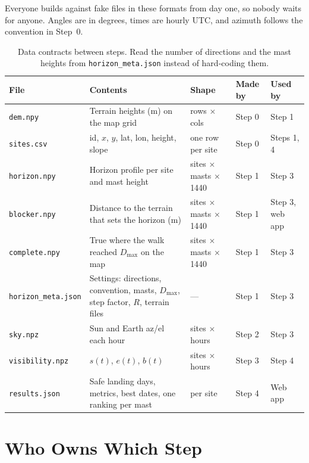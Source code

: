 \documentclass[11pt,a4paper]{article}
\begin{document}
Everyone builds against fake files in these formats from day one, so nobody waits for anyone. Angles are in degrees, times are hourly UTC, and azimuth follows the convention in Step~0.

\begin{table}[H]
\centering
\renewcommand{\arraystretch}{1.2}
{\small\setlength{\tabcolsep}{4pt}%
\begin{tabularx}{\textwidth}{l Y l l l}
\toprule
\textbf{File} & \textbf{Contents} & \textbf{Shape} & \textbf{Made by} & \textbf{Used by} \\
\midrule
\texttt{dem.npy} & Terrain heights (m) on the map grid & rows $\times$ cols & Step 0 & Step 1 \\
\texttt{sites.csv} & id, $x$, $y$, lat, lon, height, slope & one row per site & Step 0 & Steps 1, 4 \\
\texttt{horizon.npy} & Horizon profile per site and mast height & sites $\times$ masts $\times$ 1440 & Step 1 & Step 3 \\
\texttt{blocker.npy} & Distance to the terrain that sets the horizon (m) & sites $\times$ masts $\times$ 1440 & Step 1 & Step 3, web app \\
\texttt{complete.npy} & True where the walk reached $D_{\max}$ on the map & sites $\times$ masts $\times$ 1440 & Step 1 & Step 3 \\
\texttt{horizon\_meta.json} & Settings: directions, convention, masts, $D_{\max}$, step factor, $R$, terrain files & --- & Step 1 & Step 3 \\
\texttt{sky.npz} & Sun and Earth az/el each hour & sites $\times$ hours & Step 2 & Step 3 \\
\texttt{visibility.npz} & $s(t)$, $e(t)$, $b(t)$ & sites $\times$ hours & Step 3 & Step 4 \\
\texttt{results.json} & Safe landing days, metrics, best dates, one ranking per mast & per site & Step 4 & Web app \\
\bottomrule
\end{tabularx}}
\caption{Data contracts between steps. Read the number of directions and the mast heights from \texttt{horizon\_meta.json} instead of hard-coding them.}
\end{table}

\section{Who Owns Which Step}
\end{document}
